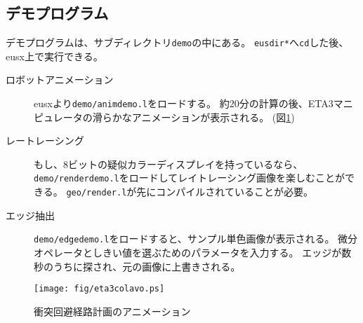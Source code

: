 \subsection{デモプログラム}
デモプログラムは、サブディレクトリ{\tt demo}の中にある。
{\tt *eusdir*}へ{\tt cd}した後、eusx上で実行できる。
\begin{description}
\item[ロボットアニメーション] 
eusxより{\tt demo/animdemo.l}をロードする。
約20分の計算の後、ETA3マニピュレータの滑らかなアニメーションが表示される。
(図\ref{animdemo})
\item[レートレーシング] 
もし、8ビットの疑似カラーディスプレイを持っているなら、
{\tt demo/renderdemo.l}をロードしてレイトレーシング画像を楽しむことができる。
{\tt geo/render.l}が先にコンパイルされていることが必要。
\item[エッジ抽出]
{\tt demo/edgedemo.l}をロードすると、サンプル単色画像が表示される。
微分オペレータとしきい値を選ぶためのパラメータを入力する。
エッジが数秒のうちに探され、元の画像に上書きされる。
\end{description}

\begin{figure}
\texttt{[image: fig/eta3colavo.ps]}
\caption{\label{animdemo}衝突回避経路計画のアニメーション}
\end{figure}

%

\newpage


